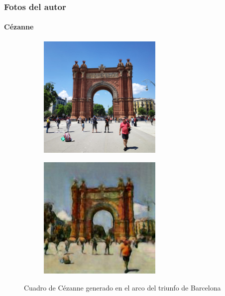 \documentclass[[../main.tex]{subfiles}
\begin{document}
        \newpage
    
\subsubsection{Fotos del autor}
    \paragraph{Cézanne}
        \begin{figure}[!htb]
            \begin{subfigure}[b]{0.49\textwidth}
            \includegraphics[width=0.65\textwidth]{imagenes/imagen2cuadro/propias/cezanne/IMG_20190520_141500.jpg}
            \end{subfigure}
        \hfill
            \begin{subfigure}[b]{0.49\textwidth}
            \includegraphics[width=0.65\textwidth]{imagenes/imagen2cuadro/propias/cezanne/IMG_20190520_141500_2.jpg}
            \end{subfigure}
        \caption{Cuadro de Cézanne generado en el arco del triunfo de Barcelona}
        \label{fig:cezanne_cuadro_arco_bcn}
        \end{figure}
        
\end{document}
